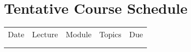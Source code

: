 \documentclass{./../Latex/syllabus}
\begin{document}
\section*{\centering Tentative Course Schedule} \vspace{0.5em}
{\renewcommand{\arraystretch}{1}
\renewcommand\multirowsetup{\centering} 
\begin{center}
\begin{tabularx}{1\textwidth}{|c|c|P{2.15cm}X|l|}
\Xhline{2\arrayrulewidth} 
Date & Lecture & Module  & Topics & Due \\
\Xhline{2\arrayrulewidth} 
 \\
\Xhline{1\arrayrulewidth} 
\end{tabularx}
\end{center}
\thispagestyle{plain}

\restoregeometry 

}
\end{document}
